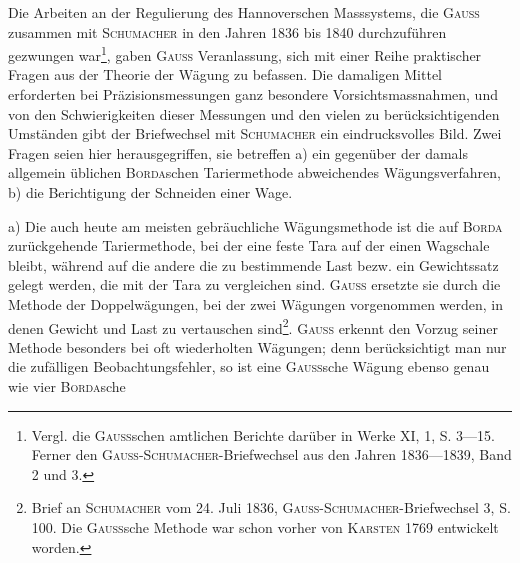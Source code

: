 \clearpage\begingroup{}
\renewcommand{\thefootnote}{\arabic{footnote})}\setcounter{footnote}{121}
\begin{center}\end{center}
\noindent\hspace*{\parindent}Die Arbeiten an der Regulierung des Hannoverschen Masssystems, die
\textsc{Gauss} zusammen mit \textsc{Schumacher} in den Jahren 1836 bis 1840 durchzuführen
gezwungen war\footnote{Vergl. die \textsc{Gauss}schen amtlichen Berichte darüber in Werke XI, 1, S. 3—15. Ferner den \textsc{Gauss-Schumacher}-Briefwechsel aus den Jahren 1836—1839, Band 2 und 3.}, gaben \textsc{Gauss} Veranlassung, sich mit einer Reihe praktischer
Fragen aus der Theorie der Wägung zu befassen. Die damaligen Mittel erforderten
bei Präzisionsmessungen ganz besondere Vorsichtsmassnahmen, und von den
Schwierigkeiten dieser Messungen und den vielen zu berücksichtigenden Umständen
gibt der Briefwechsel mit \textsc{Schumacher} ein eindrucksvolles Bild. Zwei Fragen
seien hier herausgegriffen, sie betreffen a) ein gegenüber der damals allgemein
üblichen \textsc{Borda}schen Tariermethode abweichendes Wägungsverfahren, b) die
Berichtigung der Schneiden einer Wage.

a) Die auch heute am meisten gebräuchliche Wägungsmethode ist die
auf \textsc{Borda} zurückgehende Tariermethode, bei der eine feste Tara auf der einen
Wagschale bleibt, während auf die andere die zu bestimmende Last bezw.
ein Gewichtssatz gelegt werden, die mit der Tara zu vergleichen sind. \textsc{Gauss}
ersetzte sie durch die Methode der Doppelwägungen, bei der zwei Wägungen
vorgenommen werden, in denen Gewicht und Last zu vertauschen sind\footnote{Brief an \textsc{Schumacher} vom 24. Juli 1836, \textsc{Gauss-Schumacher}-Briefwechsel 3, S. 100. Die \textsc{Gauss}sche Methode war schon vorher von \textsc{Karsten} 1769 entwickelt worden.}.
\textsc{Gauss} erkennt den Vorzug seiner Methode besonders bei oft wiederholten
Wägungen; denn berücksichtigt man nur die zufälligen Beobachtungsfehler,
so ist eine \textsc{Gauss}sche Wägung ebenso genau wie vier \textsc{Borda}sche

